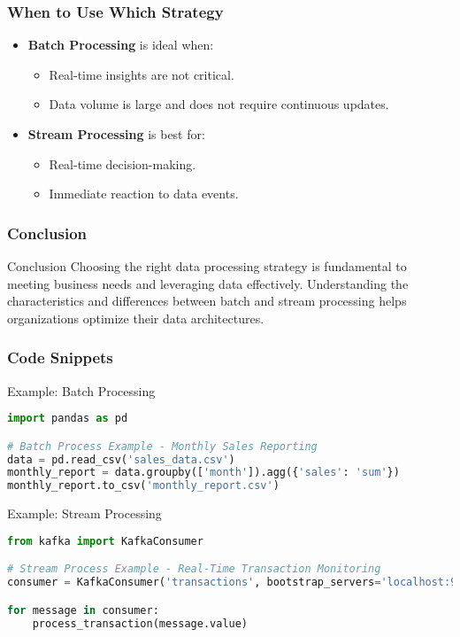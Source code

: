 \documentclass[aspectratio=169]{beamer}
\begin{document}
\begin{frame}[fragile]
  \frametitle{When to Use Which Strategy}
  \begin{itemize}
    \item \textbf{Batch Processing} is ideal when:
    \begin{itemize}
      \item Real-time insights are not critical.
      \item Data volume is large and does not require continuous updates.
    \end{itemize}

    \item \textbf{Stream Processing} is best for:
    \begin{itemize}
      \item Real-time decision-making.
      \item Immediate reaction to data events.
    \end{itemize}
  \end{itemize}
\end{frame}

\begin{frame}[fragile]
  \frametitle{Conclusion}
  \begin{block}{Conclusion}
    Choosing the right data processing strategy is fundamental to meeting business needs and leveraging data effectively. 
    Understanding the characteristics and differences between batch and stream processing helps organizations optimize their data architectures.
  \end{block}
\end{frame}

\begin{frame}[fragile]
  \frametitle{Code Snippets}
  \begin{block}{Example: Batch Processing}
    \begin{lstlisting}[language=Python]
import pandas as pd

# Batch Process Example - Monthly Sales Reporting
data = pd.read_csv('sales_data.csv')
monthly_report = data.groupby(['month']).agg({'sales': 'sum'})
monthly_report.to_csv('monthly_report.csv')
    \end{lstlisting}
  \end{block}
  
  \begin{block}{Example: Stream Processing}
    \begin{lstlisting}[language=Python]
from kafka import KafkaConsumer

# Stream Process Example - Real-Time Transaction Monitoring
consumer = KafkaConsumer('transactions', bootstrap_servers='localhost:9092')

for message in consumer:
    process_transaction(message.value)
    \end{lstlisting}
  \end{block}
\end{frame}
\end{document}
